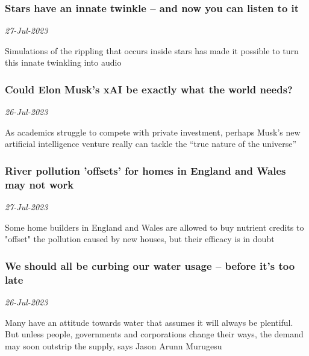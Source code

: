 \subsubsection{Stars have an innate twinkle – and now you can listen to it \href{https://www.newscientist.com/article/2384861-stars-have-an-innate-twinkle-and-now-you-can-listen-to-it/?utm_campaign=RSS%7CNSNS&utm_source=NSNS&utm_medium=RSS&utm_content=home}{}}
\textit{27-Jul-2023}

Simulations of the rippling that occurs inside stars has made it possible to turn this innate twinkling into audio
\subsubsection{Could Elon Musk's xAI be exactly what the world needs? \href{https://www.newscientist.com/article/mg25934490-700-could-elon-musks-xai-be-exactly-what-the-world-needs/?utm_campaign=RSS%7CNSNS&utm_source=NSNS&utm_medium=RSS&utm_content=home}{\ding{225}}}
\textit{26-Jul-2023}

As academics struggle to compete with private investment, perhaps Musk’s new artificial intelligence venture really can tackle the “true nature of the universe”
\subsubsection{River pollution 'offsets' for homes in England and Wales may not work \href{https://www.newscientist.com/article/2384196-river-pollution-offsets-for-homes-in-england-and-wales-may-not-work/?utm_campaign=RSS%7CNSNS&utm_source=NSNS&utm_medium=RSS&utm_content=home}{}}
\textit{27-Jul-2023}

Some home builders in England and Wales are allowed to buy nutrient credits to "offset" the pollution caused by new houses, but their efficacy is in doubt
\subsubsection{We should all be curbing our water usage – before it's too late \href{https://www.newscientist.com/article/mg25934493-500-we-should-all-be-curbing-our-water-usage-before-its-too-late/?utm_campaign=RSS%7CNSNS&utm_source=NSNS&utm_medium=RSS&utm_content=home}{\ding{225}}}
\textit{26-Jul-2023}

Many have an attitude towards water that assumes it will always be plentiful. But unless people, governments and corporations change their ways, the demand may soon outstrip the supply, says Jason Arunn Murugesu
